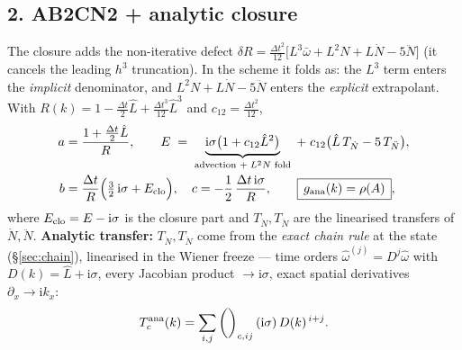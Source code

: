 \documentclass[11pt]{article}
\newcommand{\ii}{\mathrm{i}}
\newcommand{\dt}{\Delta t}
\newcommand{\Lhat}{\hat{L}}
\newcommand{\wh}{\hat{\omega}}
\begin{document}
\subsection*{2. AB2CN2 + analytic closure}
The closure adds the non-iterative defect $\delta R=\tfrac{\dt^{2}}{12}\big[L^{3}\bar\omega
+L^{2}N+L\dot N-5\ddot N\big]$ (it cancels the leading $h^3$ truncation). In the
scheme it folds as: the $L^3$ term enters the \emph{implicit} denominator, and
$L^2N+L\dot N-5\ddot N$ enters the \emph{explicit} extrapolant. With
$R(k)=1-\tfrac{\dt}{2}\Lhat+\tfrac{\dt^{3}}{12}\Lhat^{3}$ and $c_{12}=\tfrac{\dt^{2}}{12}$,
\begin{align}
  a &= \frac{1+\tfrac{\dt}{2}\Lhat}{R},\qquad
  E \;=\; \underbrace{\ii\sigma\big(1+c_{12}\Lhat^{2}\big)}_{\text{advection }+\;L^2N\text{ fold}}
      \;+\; c_{12}\big(\Lhat\,T_{\dot N}-5\,T_{\ddot N}\big),\\
  b &= \frac{\dt}{R}\Big(\tfrac{3}{2}\,\ii\sigma + E_{\rm clo}\Big),\quad
  c = -\frac{1}{2}\,\frac{\dt\,\ii\sigma}{R},
  \qquad\boxed{\,g_{\rm ana}(k)=\rho(A)\,},
  \label{eq:ana}
\end{align}
where $E_{\rm clo}=E-\ii\sigma$ is the closure part and $T_{\dot N},T_{\ddot N}$ are the
linearised transfers of $\dot N,\ddot N$. \textbf{Analytic transfer:} $T_{\dot N},T_{\ddot N}$
come from the \emph{exact chain rule} at the state (\S\ref{sec:chain}), linearised in
the Wiener freeze --- time orders $\wh^{(j)}=D^{j}\wh$ with $D(k)=\Lhat+\ii\sigma$,
every Jacobian product $\to\ii\sigma$, exact spatial derivatives $\partial_x\to\ii k_x$:
\begin{equation}
  T^{\rm ana}_{c}(k)=\sum_{i,j}\binom{}{}_{c,ij}\,(\ii\sigma)\,D(k)^{\,i+j}.
\end{equation}
\end{document}
